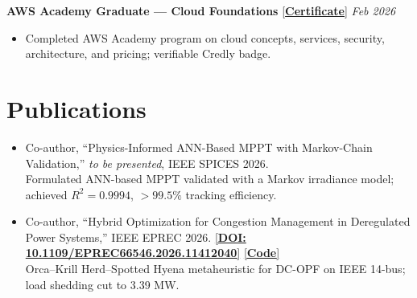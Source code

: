 \documentclass[10pt]{article}
\begin{document}
\noindent
\textbf{AWS Academy Graduate --- Cloud Foundations}
\hspace{2pt}
\href{https://www.credly.com/badges/eaed5b78-e6d1-426e-8be1-6a1c66f2bc7e/print}
{\small[\textbf{Certificate}]}
\hfill
\textit{\small Feb 2026}
\par
\vspace{1pt}

\begin{itemize}

\item Completed AWS Academy program on cloud concepts, services, security, architecture, and pricing; verifiable Credly badge.

\end{itemize}

\section{Publications}

\begin{itemize}

\item Co-author, ``Physics-Informed ANN-Based MPPT with Markov-Chain Validation,'' \textit{to be presented}, IEEE SPICES 2026.
\\ {\small Formulated ANN-based MPPT validated with a Markov irradiance model; achieved $R^2=0.9994$, $>99.5\%$ tracking efficiency.}

\item Co-author, ``Hybrid Optimization for Congestion Management in Deregulated Power Systems,'' IEEE EPREC 2026.
\href{https://doi.org/10.1109/EPREC66546.2026.11412040}
{[\textbf{DOI: 10.1109/EPREC66546.2026.11412040}]}
\href{https://github.com/niranjan-crypt/Hybrid-Optimization-for-Congestion-Management-in-Deregulated-Power-Systems}
{\small[\textbf{Code}]}
\\ {\small Orca--Krill Herd--Spotted Hyena metaheuristic for DC-OPF on IEEE 14-bus; load shedding cut to 3.39 MW.}

\end{itemize}
\end{document}

